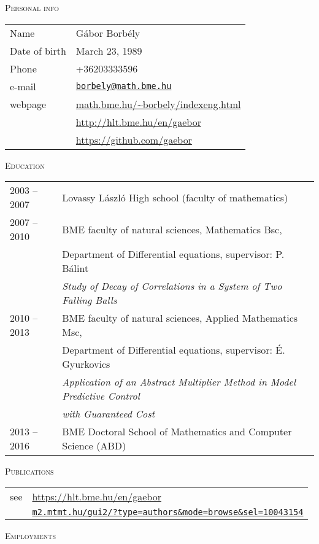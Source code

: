 \documentclass[12pt]{article}
\newcommand\mail[1]{\href{mailto:#1}{\texttt{#1}}}
\begin{document}
 \thispagestyle{empty}
 
\textsc{Personal info}

       \begin{tabular}{p{3cm}l}
	       Name & Gábor Borbély\\
           Date of birth & March 23, 1989\\
		   Phone &  +36203333596\\
		   e-mail & \mail{borbely@math.bme.hu}\\
		   webpage& \url{math.bme.hu/~borbely/indexeng.html} \\
                  & \url{http://hlt.bme.hu/en/gaebor} \\
                  & \url{https://github.com/gaebor}
       \end{tabular}

 \textsc{Education}

       \begin{tabular}{p{3cm}l}
	       2003 -- 2007 & Lovassy László High school (faculty of mathematics) \\
           2007 -- 2010& BME faculty of natural sciences, Mathematics Bsc, \\
		              & Department of Differential equations, supervisor: P. Bálint\\
					  & \emph{Study of Decay of Correlations in a System of Two Falling Balls} \\
		   2010 -- 2013 & BME faculty of natural sciences, Applied Mathematics Msc,\\
						& Department of Differential equations, supervisor: É. Gyurkovics\\
						& \emph{Application of an Abstract Multiplier Method in Model Predictive Control}\\ & \emph{ with Guaranteed Cost} \\
		    2013 -- 2016 & BME Doctoral School of Mathematics and Computer Science (ABD)
       \end{tabular}

 \textsc{Publications}

        \begin{tabular}{p{3cm}l}
	       see & \url{https://hlt.bme.hu/en/gaebor} \\ 
               &  \href{https://m2.mtmt.hu/gui2/?type=authors&mode=browse&sel=10043154}{\texttt{m2.mtmt.hu/gui2{\footnotesize/?type=authors\&mode=browse\&sel=10043154}}}
       \end{tabular}

 \textsc{Employments}
\end{document}
